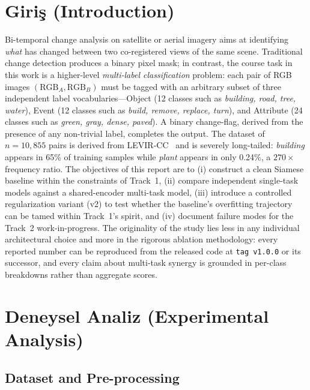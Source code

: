 \documentclass[journal]{IEEEtran}
\begin{document}
\section{Giri\c{s} (Introduction)}\label{sec:giris}
Bi-temporal change analysis on satellite or aerial imagery aims at identifying \emph{what} has changed between two co-registered views of the same scene. Traditional change detection produces a binary pixel mask; in contrast, the course task in this work is a higher-level \emph{multi-label classification} problem: each pair of RGB images $(\mathrm{RGB}_A,\mathrm{RGB}_B)$ must be tagged with an arbitrary subset of three independent label vocabularies---Object (12 classes such as \emph{building, road, tree, water}), Event (12 classes such as \emph{build, remove, replace, turn}), and Attribute (24 classes such as \emph{green, gray, dense, paved}). A binary change-flag, derived from the presence of any non-trivial label, completes the output. The dataset of $n{=}10{,}855$ pairs is derived from LEVIR-CC~\cite{liu2022levircc} and is severely long-tailed: \emph{building} appears in 65\% of training samples while \emph{plant} appears in only 0.24\%, a $270\times$ frequency ratio. The objectives of this report are to (i) construct a clean Siamese baseline within the constraints of Track~1, (ii) compare independent single-task models against a shared-encoder multi-task model, (iii) introduce a controlled regularization variant (v2) to test whether the baseline's overfitting trajectory can be tamed within Track~1's spirit, and (iv) document failure modes for the Track~2 work-in-progress. The originality of the study lies less in any individual architectural choice and more in the rigorous ablation methodology: every reported number can be reproduced from the released code at \texttt{tag~v1.0.0} or its successor, and every claim about multi-task synergy is grounded in per-class breakdowns rather than aggregate scores.

\section{Deneysel Analiz (Experimental Analysis)}\label{sec:deneyselanaliz}

\subsection{Dataset and Pre-processing}\label{ssec:dataset}
\end{document}
